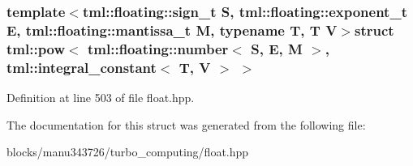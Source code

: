 \subsubsection*{template$<$tml\+::floating\+::sign\+\_\+t S, tml\+::floating\+::exponent\+\_\+t E, tml\+::floating\+::mantissa\+\_\+t M, typename T, T V$>$struct tml\+::pow$<$ tml\+::floating\+::number$<$ S, E, M $>$, tml\+::integral\+\_\+constant$<$ T, V $>$ $>$}



Definition at line 503 of file float.\+hpp.



The documentation for this struct was generated from the following file\+:\begin{DoxyCompactItemize}
\item 
blocks/manu343726/turbo\+\_\+computing/float.\+hpp\end{DoxyCompactItemize}
